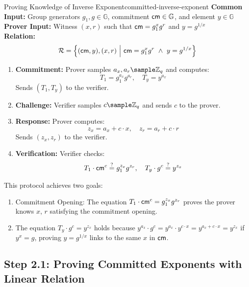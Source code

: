 \begin{protocol}{Proving Knowledge of Inverse Exponent}{committed-inverse-exponent}\label{pok-committed-inverse-exponent}
\textbf{Common Input:} Group generators $g_1, g \in \mathbb{G}$, commitment $\mathsf{cm} \in \mathbb{G}$, and element $y \in \mathbb{G}$ \\
\textbf{Prover Input:} Witness $(x, r)$ such that $\mathsf{cm} = g_1^x g^r$ and $y = g^{1/x}$ \\
\textbf{Relation:} 
\[
\mathcal{R} = \left\{ (\mathsf{cm}, y), (x, r) \ \middle|\ \mathsf{cm} = g_1^x g^r \ \land\ y = g^{1/x} \right\}
\]
\begin{enumerate}
    \item \textbf{Commitment:} Prover samples $a_x, a_r \sample \mathbb{Z}_q$ and computes:
    \[
    T_1 = g_1^{a_x} g^{a_r}, \quad T_y = y^{a_x}
    \]
    Sends $(T_1, T_y)$ to the verifier.

    \item \textbf{Challenge:} Verifier samples $c  \sample  \mathbb{Z}_q$ and sends $c$ to the prover.

    \item \textbf{Response:} Prover computes:
    \[
    z_x = a_x + c \cdot x, \quad z_r = a_r + c \cdot r
    \]
    Sends $(z_x, z_r)$ to the verifier.

    \item \textbf{Verification:} Verifier checks:
    \[
    T_1 \cdot \mathsf{cm}^c \stackrel{?}{=} g_1^{z_x} g^{z_r}, \quad T_y \cdot g^c \stackrel{?}{=} y^{z_x}
    \]
\end{enumerate}
\end{protocol}

This protocol achieves two goals:
\begin{enumerate}
    \item Commitment Opening: The equation $T_1 \cdot \mathsf{cm}^c = g_1^{z_x} g^{z_r}$ proves the prover knows $x$, $r$ satisfying the commitment opening.
    \item The equation $T_y \cdot g^c = y^{z_x}$ holds because $y^{a_x} \cdot g^c = y^{a_x} \cdot y^{c \cdot x} = y^{a_x + c \cdot x} = y^{z_x}$ if $y^x = g$, proving $y = g^{1/x}$ links to the same $x$ in $\mathsf{cm}$.
\end{enumerate}






\newpage
\subsection{Step 2.1: Proving Committed Exponents with Linear Relation}

